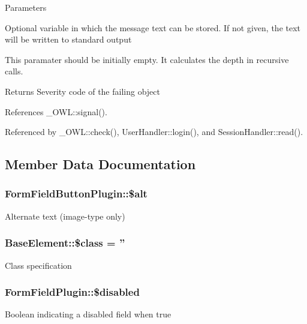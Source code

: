 \begin{DoxyParams}{Parameters}
\item[\mbox{\tt[out]} {\em \$text}]Optional variable in which the message text can be stored. If not given, the text will be written to standard output \item[\mbox{\tt[in]} {\em \$depth}]This paramater should be initially empty. It calculates the depth in recursive calls. \end{DoxyParams}
\begin{DoxyReturn}{Returns}
Severity code of the failing object 
\end{DoxyReturn}


References \_\-OWL::signal().



Referenced by \_\-OWL::check(), UserHandler::login(), and SessionHandler::read().



\subsection{Member Data Documentation}
\subsubsection[{\$alt}]{\setlength{\rightskip}{0pt plus 5cm}FormFieldButtonPlugin::\$alt}\label{classFormFieldButtonPlugin_ad508b2eca248b109cb6409abdf00ffb5}
Alternate text (image-\/type only) 
\subsubsection[{\$class}]{\setlength{\rightskip}{0pt plus 5cm}BaseElement::\$class = ''}\label{classBaseElement_a99976a8e967db92e7800309f359b0803}
Class specification 
\subsubsection[{\$disabled}]{\setlength{\rightskip}{0pt plus 5cm}FormFieldPlugin::\$disabled}\label{classFormFieldPlugin_a2e589ab9610052dfbba6170d6117be37}
Boolean indicating a disabled field when true 
